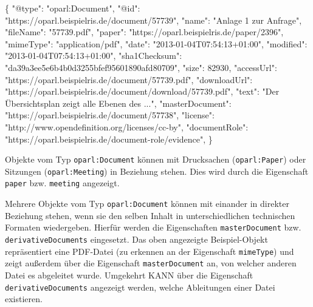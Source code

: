 \documentclass[,a4paper]{article}
\newenvironment{Shaded}{}{}
\newcommand{\DataTypeTok}[1]{\textcolor[rgb]{0.56,0.13,0.00}{{#1}}}
\newcommand{\DecValTok}[1]{\textcolor[rgb]{0.25,0.63,0.44}{{#1}}}
\newcommand{\StringTok}[1]{\textcolor[rgb]{0.25,0.44,0.63}{{#1}}}
\newcommand{\FunctionTok}[1]{\textcolor[rgb]{0.02,0.16,0.49}{{#1}}}
\begin{document}
\begin{Shaded}
\begin{Highlighting}[]
\FunctionTok{\{}
    \DataTypeTok{"@type"}\FunctionTok{:} \StringTok{"oparl:Document"}\FunctionTok{,}
    \DataTypeTok{"@id"}\FunctionTok{:} \StringTok{"https://oparl.beispielris.de/document/57739"}\FunctionTok{,}
    \DataTypeTok{"name"}\FunctionTok{:} \StringTok{"Anlage 1 zur Anfrage"}\FunctionTok{,}
    \DataTypeTok{"fileName"}\FunctionTok{:} \StringTok{"57739.pdf"}\FunctionTok{,}
    \DataTypeTok{"paper"}\FunctionTok{:} \StringTok{"https://oparl.beispielris.de/paper/2396"}\FunctionTok{,}
    \DataTypeTok{"mimeType"}\FunctionTok{:} \StringTok{"application/pdf"}\FunctionTok{,}
    \DataTypeTok{"date"}\FunctionTok{:} \StringTok{"2013-01-04T07:54:13+01:00"}\FunctionTok{,}
    \DataTypeTok{"modified"}\FunctionTok{:} \StringTok{"2013-01-04T07:54:13+01:00"}\FunctionTok{,}
    \DataTypeTok{"sha1Checksum"}\FunctionTok{:} \StringTok{"da39a3ee5e6b4b0d3255bfef95601890afd80709"}\FunctionTok{,}
    \DataTypeTok{"size"}\FunctionTok{:} \DecValTok{82930}\FunctionTok{,}
    \DataTypeTok{"accessUrl"}\FunctionTok{:} \StringTok{"https://oparl.beispielris.de/document/57739.pdf"}\FunctionTok{,}
    \DataTypeTok{"downloadUrl"}\FunctionTok{:} \StringTok{"https://oparl.beispielris.de/document/download/57739.pdf"}\FunctionTok{,}
    \DataTypeTok{"text"}\FunctionTok{:} \StringTok{"Der Übersichtsplan zeigt alle Ebenen des ..."}\FunctionTok{,}
    \DataTypeTok{"masterDocument"}\FunctionTok{:} \StringTok{"https://oparl.beispielris.de/document/57738"}\FunctionTok{,}
    \DataTypeTok{"license"}\FunctionTok{:} \StringTok{"http://www.opendefinition.org/licenses/cc-by"}\FunctionTok{,}
    \DataTypeTok{"documentRole"}\FunctionTok{:} \StringTok{"https://oparl.beispielris.de/document-role/evidence"}\FunctionTok{,}
\FunctionTok{\}}
\end{Highlighting}
\end{Shaded}

Objekte vom Typ \texttt{oparl:Document} können mit Drucksachen
(\texttt{oparl:Paper}) oder Sitzungen (\texttt{oparl:Meeting}) in
Beziehung stehen. Dies wird durch die Eigenschaft \texttt{paper} bzw.
\texttt{meeting} angezeigt.

Mehrere Objekte vom Typ \texttt{oparl:Document} können mit einander in
direkter Beziehung stehen, wenn sie den selben Inhalt in
unterschiedlichen technischen Formaten wiedergeben. Hierfür werden die
Eigenschaften \texttt{masterDocument} bzw. \texttt{derivativeDocuments}
eingesetzt. Das oben angezeigte Beispiel-Objekt repräsentiert eine
PDF-Datei (zu erkennen an der Eigenschaft \texttt{mimeType}) und zeigt
außerdem über die Eigenschaft \texttt{masterDocument} an, von welcher
anderen Datei es abgeleitet wurde. Umgekehrt KANN über die Eigenschaft
\texttt{derivativeDocuments} angezeigt werden, welche Ableitungen einer
Datei existieren.
\end{document}
